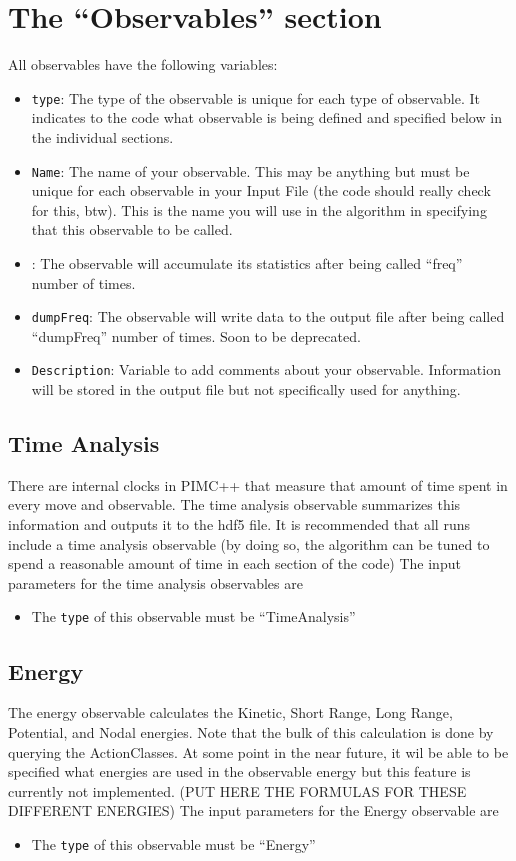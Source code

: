 \documentclass{book}
\begin{document}
\section{The ``Observables'' section}
All observables have the following variables:
\begin{itemize}
\item \texttt{type}: The type of the observable is unique for each
  type of observable.  It indicates to the code what observable is being
  defined and specified below in the individual sections.

\item \texttt{Name}: The name of your observable. This may be anything
   but must be unique for each observable in your Input File (the code should
   really check for this, btw).  This is the name you will use in the
   algorithm in specifying that this observable to be called.

\item {}:  The observable will accumulate its statistics
  after being called ``freq'' number of times.  
\item \texttt{dumpFreq}: The observable will write data to the output
  file after being called ``dumpFreq'' number of times. Soon to be
  deprecated.
\item \texttt {Description}: Variable to add comments about your
  observable. Information will be stored in the output file but not
  specifically used for anything.

\end{itemize}
\subsection{Time Analysis}
There are internal clocks in PIMC++ that measure that amount of time spent in every move and observable.  The time analysis observable summarizes this information and outputs it to the hdf5 file. It is recommended that all runs include a time analysis observable (by doing so, the algorithm can be tuned to spend a reasonable amount of time in each section of the code)
The input parameters for the time analysis observables are 
\begin{itemize}
\item The \texttt{type} of this observable must be ``TimeAnalysis''
\end{itemize}
\subsection{Energy}
The energy observable calculates the Kinetic, Short Range, Long Range, Potential, and Nodal energies. Note that the bulk of this calculation is done by querying the ActionClasses. At some point in the near future, it wil be able to be specified what energies are used in the observable energy but this feature is currently not implemented.  (PUT HERE THE FORMULAS FOR THESE DIFFERENT ENERGIES)
The input parameters for the Energy observable are
\begin{itemize}
\item The \texttt{type} of this observable must be ``Energy''
\end{itemize}
\end{document}
